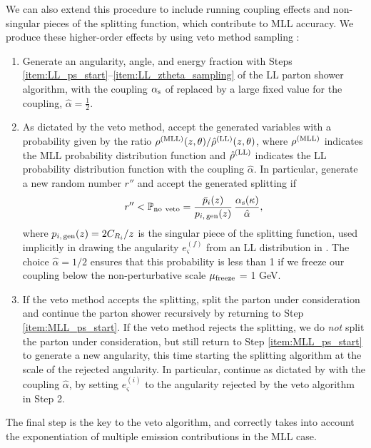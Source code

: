 We can also extend this procedure to include running coupling effects and non-singular pieces of the splitting function, which contribute to MLL accuracy.
%
We produce these higher-order effects by using veto method sampling \cite{Sjostrand:2007gs,Larkoski:2013paa,Sjostrand:2014zea}:
%
\begin{enumerate}
	\item
	\label{item:MLL_ps_start}
	Generate an angularity, angle, and energy fraction with Steps \ref{item:LL_ps_start}--\ref{item:LL_ztheta_sampling} of the LL parton shower algorithm, with the coupling \(\alpha_{\mathrm{s}}\) of  replaced by a large fixed value for the coupling, \(\hat\alpha = \frac{1}{2}\).

	\item
	As dictated by the veto method, accept the generated variables with a probability given by the ratio \(\rho^{\rm(MLL)}(z,\theta)/\hat\rho^{\rm(LL)}(z,\theta)\), where \(\rho^{\rm(MLL)}\) indicates the MLL probability distribution function and \(\hat\rho^{\rm(LL)}\) indicates the LL probability distribution function with the coupling \(\hat\alpha\).
	In particular, generate a new random number \(r''\) and accept the generated splitting if
	\begin{align}
	    r'' < \mathbb{P}_{\rm no~veto}
	    =
	    \frac{\bar{p}_i(z)}{p_{i,\,\rm gen}(z)}\,\frac{\alpha_{\mathrm{s}}(\kappa)}{\hat\alpha}
	    ,
	\end{align}
	where \(p_{i,\,\rm gen}(z) = 2 C_{R_i} / z\) is the singular piece of the splitting function, used implicitly in drawing the angularity \(e_\varsigma^{(f)}\) from an LL distribution in .
    The choice \(\hat \alpha = 1/2\) ensures that this probability is less than 1 if we freeze our coupling below the non-perturbative scale \(\mu_{\rm freeze}\) = 1 GeV.

	\item
	If the veto method accepts the splitting, split the parton under consideration and continue the parton shower recursively by returning to Step \ref{item:MLL_ps_start}.
	If the veto method rejects the splitting, we do \textit{not} split the parton under consideration, but still return to Step \ref{item:MLL_ps_start} to generate a new angularity, this time starting the splitting algorithm at the scale of the rejected angularity.
	In particular, continue as dictated by  with the coupling \(\hat\alpha\), by setting \(e_\varsigma^{(i)}\) to the angularity rejected by the veto algorithm in Step 2.
\end{enumerate}
%
The final step is the key to the veto algorithm, and correctly takes into account the exponentiation of multiple emission contributions in the MLL case.

